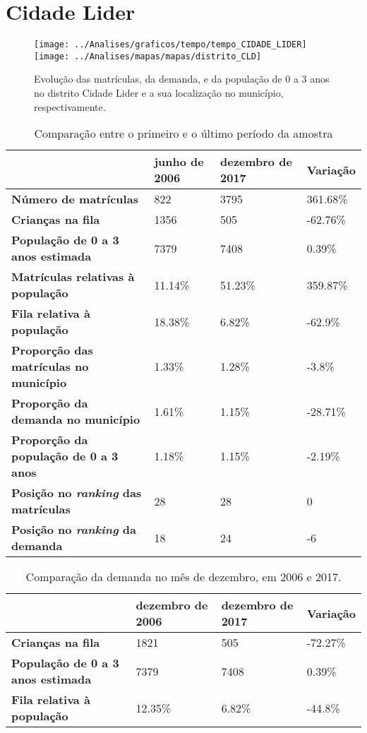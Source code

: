 \section{Cidade Lider}
\begin{figure}[H]
	\centering
	\texttt{[image: ../Analises/graficos/tempo/tempo\_CIDADE\_LIDER]}
	\texttt{[image: ../Analises/mapas/mapas/distrito\_CLD]}
	\caption{Evolução das matrículas, da demanda, e da população de 0 a 3 anos no distrito Cidade Lider e a sua localização no município, respectivamente.}
\end{figure}
\begin{table}[H]
	\begin{tabular}{|l|l|l|l|}
		\hline
		\textbf{}                                      & \textbf{junho de 2006}       & \textbf{dezembro de 2017}    & \textbf{Variação} \\ \hline
		\textbf{Número de matrículas}                  & 822 & 3795 & 361.68\% \\ \hline
		\textbf{Crianças na fila}                      & 1356 & 505 & -62.76\% \\ \hline
		\textbf{População de 0 a 3 anos estimada}      & 7379 & 7408 & 0.39\% \\ \hline
		\textbf{Matrículas relativas à população}      & 11.14\% & 51.23\% & 359.87\% \\ \hline
		\textbf{Fila relativa à população}             & 18.38\% & 6.82\% & -62.9\% \\ \hline
		\textbf{Proporção das matrículas no município} & 1.33\% & 1.28\% & -3.8\% \\ \hline
		\textbf{Proporção da demanda no município}     & 1.61\% & 1.15\% & -28.71\% \\ \hline
		\textbf{Proporção da população de 0 a 3 anos}  & 1.18\% & 1.15\% & -2.19\% \\ \hline
		\textbf{Posição no \textit{ranking} das matrículas}     & 28 & 28 & 0 \\ \hline
		\textbf{Posição no \textit{ranking} da demanda}         & 18 & 24 & -6 \\ \hline
	\end{tabular}
	\caption{Comparação entre o primeiro e o último período da amostra}
\end{table}
\begin{table}[H]
	\begin{tabular}{|l|l|l|l|}
		\hline
		\textbf{}                                 & \textbf{dezembro de 2006} & \textbf{dezembro de 2017} & \textbf{Variação} \\ \hline
		\textbf{Crianças na fila}                      & 1821 & 505 & -72.27\% \\ \hline
		\textbf{População de 0 a 3 anos estimada}      & 7379 & 7408 & 0.39\% \\ \hline
		\textbf{Fila relativa à população}             & 12.35\% & 6.82\% & -44.8\% \\ \hline
	\end{tabular}
	\caption{Comparação da demanda no mês de dezembro, em 2006 e 2017.}
\end{table}
